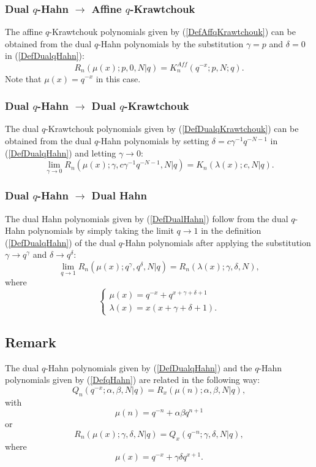 \documentclass[envcountchap,graybox]{svmono}
\newcounter{rom}
\begin{document}
\subsubsection*{Dual $q$-Hahn $\rightarrow$ Affine $q$-Krawtchouk}
The affine $q$-Krawtchouk polynomials given by (\ref{DefAffqKrawtchouk})
can be obtained from the dual $q$-Hahn polynomials by the substitution $\gamma=p$
and $\delta=0$ in (\ref{DefDualqHahn}):
\begin{equation}
R_n(\mu(x);p,0,N|q)=K_n^{Aff}(q^{-x};p,N;q).
\end{equation}
Note that $\mu(x)=q^{-x}$ in this case.

\subsubsection*{Dual $q$-Hahn $\rightarrow$ Dual $q$-Krawtchouk}
The dual $q$-Krawtchouk polynomials given by (\ref{DefDualqKrawtchouk}) can
be obtained from the dual $q$-Hahn polynomials by setting $\delta=c\gamma^{-1}q^{-N-1}$
in (\ref{DefDualqHahn}) and letting $\gamma\rightarrow 0$:
\begin{equation}
\lim_{\gamma\rightarrow 0}
R_n(\mu(x);\gamma,c\gamma^{-1}q^{-N-1},N|q)=K_n(\lambda(x);c,N|q).
\end{equation}

\subsubsection*{Dual $q$-Hahn $\rightarrow$ Dual Hahn}
The dual Hahn polynomials given by (\ref{DefDualHahn}) follow from the dual $q$-Hahn
polynomials by simply taking the limit $q\rightarrow 1$ in the definition (\ref{DefDualqHahn})
of the dual $q$-Hahn polynomials after applying the substitution
$\gamma\rightarrow q^{\gamma}$ and $\delta\rightarrow q^{\delta}$:
\begin{equation}
\lim_{q\rightarrow 1}R_n(\mu(x);q^{\gamma},q^{\delta},N|q)=R_n(\lambda(x);\gamma,\delta,N),
\end{equation}
where
$$\left\{\begin{array}{l}
\displaystyle\mu(x)=q^{-x}+q^{x+\gamma+\delta+1}\\[5mm]
\displaystyle\lambda(x)=x(x+\gamma+\delta+1).
\end{array}\right.$$

\subsection*{Remark}
The dual $q$-Hahn polynomials given by (\ref{DefDualqHahn}) and the
$q$-Hahn polynomials given by (\ref{DefqHahn}) are related in the following way:
$$Q_n(q^{-x};\alpha,\beta,N|q)=R_x(\mu(n);\alpha,\beta,N|q),$$
with
$$\mu(n)=q^{-n}+\alpha\beta q^{n+1}$$
or
$$R_n(\mu(x);\gamma,\delta,N|q)=Q_x(q^{-n};\gamma,\delta,N|q),$$
where
$$\mu(x)=q^{-x}+\gamma\delta q^{x+1}.$$
\end{document}
